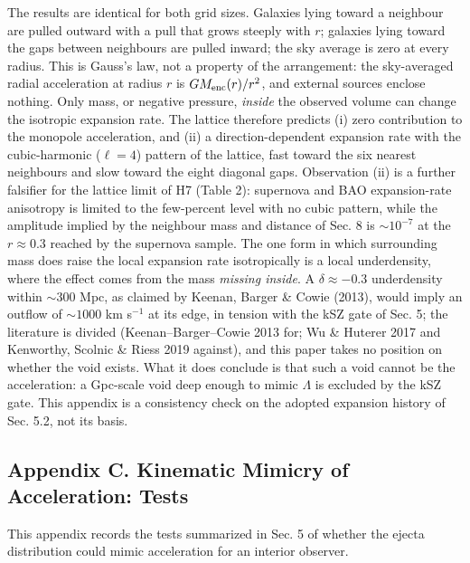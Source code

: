 \documentclass[
]{article}
\begin{document}
The results are identical for both grid sizes. Galaxies lying toward a
neighbour are pulled outward with a pull that grows steeply with \(r\);
galaxies lying toward the gaps between neighbours are pulled inward; the
sky average is zero at every radius. This is Gauss's law, not a property
of the arrangement: the sky-averaged radial acceleration at radius \(r\)
is \(G M_{\rm enc}(r)/r^2\), and external sources enclose nothing. Only
mass, or negative pressure, \emph{inside} the observed volume can change
the isotropic expansion rate. The lattice therefore predicts (i) zero
contribution to the monopole acceleration, and (ii) a
direction-dependent expansion rate with the cubic-harmonic
(\(\ell = 4\)) pattern of the lattice, fast toward the six nearest
neighbours and slow toward the eight diagonal gaps. Observation (ii) is
a further falsifier for the lattice limit of H7 (Table 2): supernova and
BAO expansion-rate anisotropy is limited to the few-percent level with
no cubic pattern, while the amplitude implied by the neighbour mass and
distance of Sec. 8 is \(\sim\!10^{-7}\) at the \(r \approx 0.3\) reached
by the supernova sample. The one form in which surrounding mass does
raise the local expansion rate isotropically is a local underdensity,
where the effect comes from the mass \emph{missing inside}. A
\(\delta \approx -0.3\) underdensity within \(\sim\!300\) Mpc, as
claimed by Keenan, Barger \& Cowie (2013), would imply an outflow of
\(\sim\!1000\) km s\(^{-1}\) at its edge, in tension with the kSZ gate
of Sec. 5; the literature is divided (Keenan--Barger--Cowie 2013 for; Wu
\& Huterer 2017 and Kenworthy, Scolnic \& Riess 2019 against), and this
paper takes no position on whether the void exists. What it does
conclude is that such a void cannot be the acceleration: a Gpc-scale
void deep enough to mimic \(\Lambda\) is excluded by the kSZ gate. This
appendix is a consistency check on the adopted expansion history of Sec.
5.2, not its basis.

\hypertarget{appendix-c.-kinematic-mimicry-of-acceleration-tests}{%
\subsection{\texorpdfstring{\textbf{Appendix C. Kinematic Mimicry of
Acceleration:
Tests}}{Appendix C. Kinematic Mimicry of Acceleration: Tests}}\label{appendix-c.-kinematic-mimicry-of-acceleration-tests}}

This appendix records the tests summarized in Sec. 5 of whether the
ejecta distribution could mimic acceleration for an interior observer.
\end{document}
